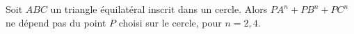 Soit $ABC$ un triangle équilatéral inscrit dans un cercle. Alors $PA^n + PB^n + PC^n$ ne dépend pas du point $P$ choisi sur le cercle, pour $n = 2, 4$.
